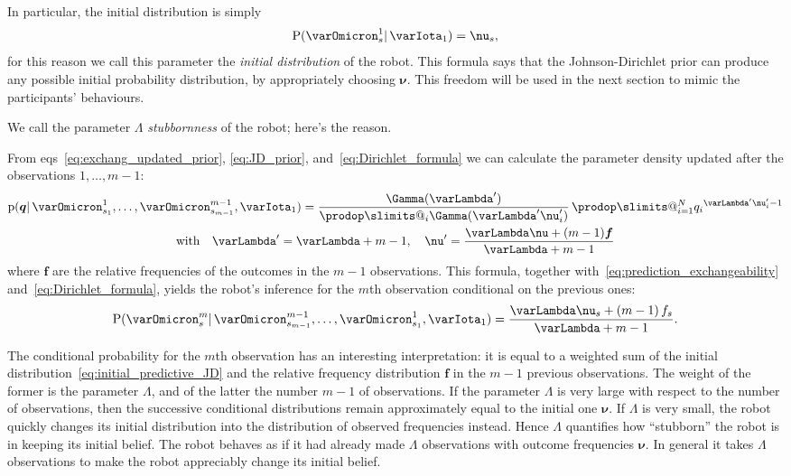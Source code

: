 \documentclass[\ifafour a4paper,12pt,\else a5paper,10pt,\fi%
onecolumn,oneside,article,%
british%
]{memoir}
\makeatletter
\theoremstyle{remark}
\theoremstyle{innote}
\def\prod{\DOTSI\prodop\slimits@}
\newcommand*{\pf}{\mathrm{p}}%
\newcommand*{\p}{\mathrm{P}}%
\renewcommand*{\|}{\mathpunct{|}}
\newcommand*{\eqns}{eqs}%
\newcommand*{\yqq}{q}
\newcommand*{\yq}{\bm{\yqq}}
\newcommand*{\yff}{f}
\newcommand*{\yf}{\bm{\yff}}
\newcommand*{\yI}{\varIota}
\newcommand*{\yMJ}{\yI_1}
\newcommand*{\yN}{\varLambda}
\newcommand*{\ynn}{\nu}
\newcommand*{\yn}{\bm{\nu}}
\makeatother
\begin{document}
In particular, the initial distribution is simply
\begin{equation}
  \label{eq:initial_predictive_JD}
  \p(\varOmicron^1_{s} \| \yMJ)  = \ynn_s,
\end{equation}
for this reason we call this parameter the \emph{initial distribution} of
the robot. This formula says that the Johnson-Dirichlet prior can produce
any possible initial probability distribution, by appropriately choosing
$\yn$. This freedom will be used in the next section to mimic the
participants' behaviours.

We call the parameter $\yN$ \emph{stubbornness} of the robot; here's the
reason.

From \eqns~\eqref{eq:exchang_updated_prior}, \eqref{eq:JD_prior},
and~\eqref{eq:Dirichlet_formula} we can calculate the parameter density
updated after the observations $1,\dotsc,m-1$:
\begin{multline}
  \label{eq:update_prior_JD}
  \pf(\yq \| \varOmicron^1_{s_1}, \dotsc, \varOmicron^{m-1}_{s_{m-1}}, \yMJ)
  = 
  \frac{\Gamma(\yN')}{\prod_i \Gamma(\yN'\ynn_i')}\,
  \prod_{i=1}^{N}{\yqq_i}^{\yN'\ynn_i'-1}
  \\
  \text{with}\quad \yN' =\yN+m-1,\quad
  \yn'=\frac{\yN\yn+(m-1)\yf}{\yN+m-1}
\end{multline}
where $\yf$ are the relative frequencies of the outcomes in the $m-1$
observations. This formula, together
with~\eqref{eq:prediction_exchangeability} and~\eqref{eq:Dirichlet_formula},
yields the robot's inference for the $m$th observation conditional on the
previous ones:
\begin{equation}
  \label{eq:predictive_JD_general}
  \p(\varOmicron^{m}_{s} \| \varOmicron^{m-1}_{s_{m-1}},\dotsc,\varOmicron^1_{s_1}, \yMJ) =
\frac{\yN\ynn_s + (m-1)\,\yff_s}{\yN+m-1}.
\end{equation}

The conditional probability for the $m$th observation has an interesting
interpretation: it is equal to a weighted sum of the initial
distribution~\eqref{eq:initial_predictive_JD} and the relative frequency
distribution $\yf$ in the $m-1$ previous observations. The weight of the
former is the parameter $\yN$, and of the latter the number $m-1$ of
observations. If the parameter $\yN$ is very large with respect to the
number of observations, then the successive conditional distributions
remain approximately equal to the initial one $\yn$. If $\yN$ is very
small, the robot quickly changes its initial distribution into the
distribution of observed frequencies instead. Hence $\yN$ quantifies how
\enquote{stubborn} the robot is in keeping its initial belief. The robot
behaves as if it had already made $\yN$ observations with outcome
frequencies $\yn$. In general it takes $\yN$ observations to make the robot
appreciably change its initial belief.
\end{document}
